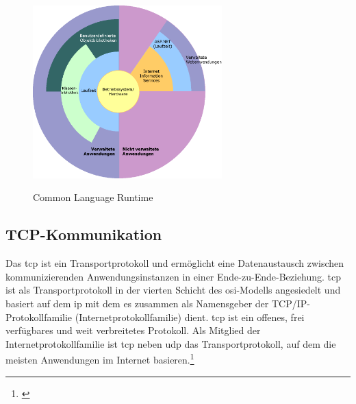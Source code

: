 \begin{figure}[h]
	\centering
	\includegraphics[width=0.65\textwidth]{images/technische_grundlagen/clr.png}
	\caption{Common Language Runtime}
	\cite{Microsoft.Overviewof}
	\label{fig:clr}
\end{figure}

\subsection{TCP-Kommunikation}
Das \gls{tcp} ist ein Transportprotokoll und ermöglicht eine Datenaustausch zwischen kommunizierenden Anwendungsinstanzen in einer Ende-zu-Ende-Beziehung. \gls{tcp} ist als Transportprotokoll in der vierten Schicht des \gls{osi}-Modells angesiedelt und basiert auf dem \gls{ip} mit dem es zusammen als Namensgeber der TCP/IP-Protokollfamilie (Internetprotokollfamilie) dient.
\gls{tcp} ist ein offenes, frei verfügbares und weit verbreitetes Protokoll. Als Mitglied der Internetprotokollfamilie ist \gls{tcp} neben \gls{udp} das Transportprotokoll, auf dem die meisten Anwendungen im Internet basieren.\footnote{\citep[vgl.][Grundkurs Datenkommunikation, Seite 189]{Mandl.GrundkursDatenkommunikation}\label{note43}}
